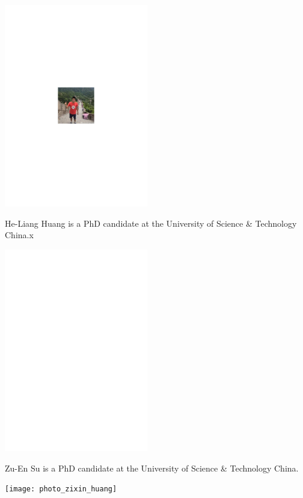 \begin{center}
\includegraphics[width=0.47\textwidth]{photo_heliang_huang}
\end{center}

He-Liang Huang is a PhD candidate at the University of Science \& Technology China.x

%
%

\begin{center}
\includegraphics[width=0.47\textwidth]{photo_zuen_su}
\end{center}

Zu-En Su is a PhD candidate at the University of Science \& Technology China.


%
%

\begin{center}
\texttt{[image: photo\_zixin\_huang]}
\end{center}

